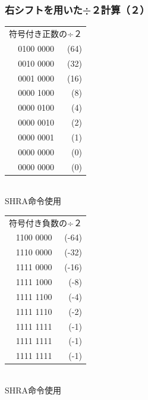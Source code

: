 \documentclass[handout]{beamer}        %
\begin{document}
\begin{frame}
  \frametitle{右シフトを用いた÷２計算（２）}
  \begin{minipage}{0.48\columnwidth}
    \begin{center}
      {\ttfamily%
        \begin{tabular}{r r}
          \multicolumn{2}{c}{符号付き正数の÷２} \\
          0100 0000 & (64) \\
          0010 0000 & (32) \\
          0001 0000 & (16) \\
          0000 1000 & (8)  \\
          0000 0100 & (4)  \\
          0000 0010 & (2)  \\
          0000 0001 & (1)  \\
          0000 0000 & (0)  \\
          0000 0000 & (0)  \\
        \end{tabular}
      }\\
      \vspace{0.5cm}
      SHRA命令使用
    \end{center}
  \end{minipage}
  \begin{minipage}{0.48\columnwidth}
    \begin{center}
      {\ttfamily%
        \begin{tabular}{r r}
          \multicolumn{2}{c}{符号付き負数の÷２} \\
          1100 0000 & (-64) \\
          1110 0000 & (-32) \\
          1111 0000 & (-16) \\
          1111 1000 & (-8)  \\
          1111 1100 & (-4)  \\
          1111 1110 & (-2)  \\
          1111 1111 & (-1)  \\
          1111 1111 & (-1)  \\
          1111 1111 & (-1)  \\
        \end{tabular}
      }\\
      \vspace{0.5cm}
      SHRA命令使用
    \end{center}
  \end{minipage}
  \vfill
\end{frame}
\end{document}
